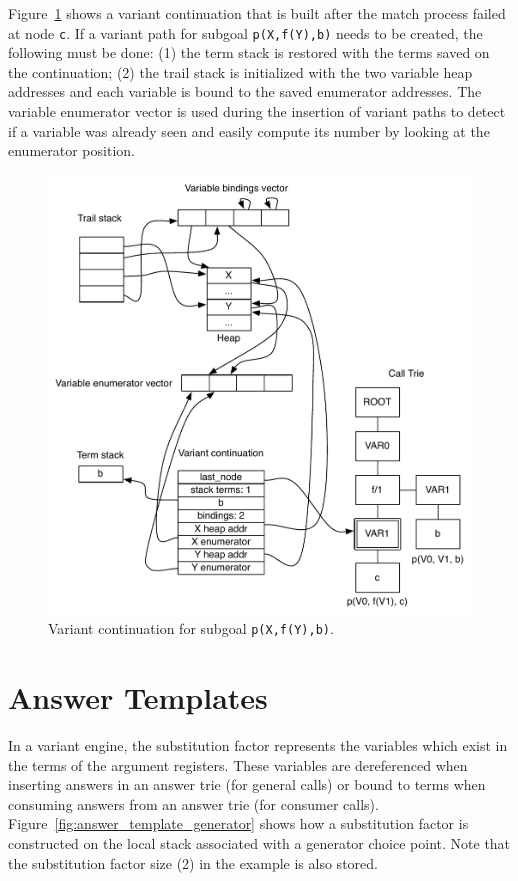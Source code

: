 Figure~\ref{fig:variant_continuation} shows a variant continuation that is built
after the match process failed at node \texttt{c}. If a variant path
for subgoal \texttt{p(X,f(Y),b)} needs to be created, the following must be done:
(1) the term stack is restored with the terms saved on the continuation;
(2) the trail stack is initialized with
the two variable heap addresses and each variable is bound to the saved
enumerator addresses. The variable enumerator vector is used during the insertion
of variant paths to detect if a variable was already seen and easily compute its number by
looking at the enumerator position.

\begin{figure}[ht]
  \centering
    \includegraphics[scale=0.6]{variant_continuation.pdf}
  \caption{Variant continuation for subgoal \texttt{p(X,f(Y),b)}.}
  \label{fig:variant_continuation}
\end{figure}

\section{Answer Templates}

In a variant engine, the substitution factor \cite{RamakrishnanIV-95}
represents the variables which exist in the terms of the argument registers.
These variables are dereferenced when inserting answers in an answer trie (for general calls)
or bound to terms when consuming answers from an answer trie (for consumer calls).
Figure~\ref{fig:answer_template_generator} shows how a substitution factor is constructed
on the local stack associated with a generator choice point.
Note that the substitution factor size (2) in the example is also stored.

